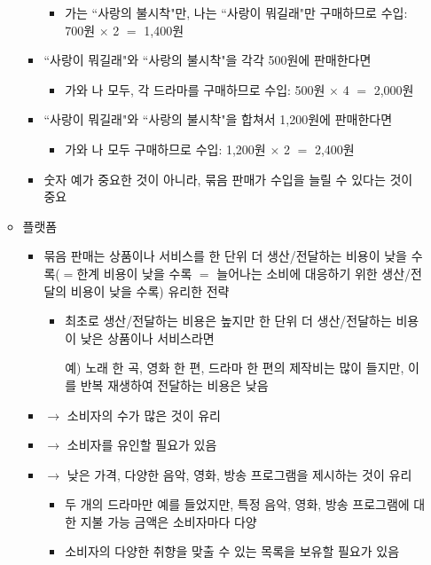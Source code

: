 \begin{itemize}
\begin{itemize}
\begin{itemize}
			\begin{itemize}
			\item 가는 ``사랑의 불시착"만, 나는 ``사랑이 뭐길래"만 구매하므로 수입: 700원 $\times$ 2 $=$ 1,400원
			\end{itemize}
		\item ``사랑이 뭐길래"와 ``사랑의 불시착"을 각각 500원에 판매한다면
			\begin{itemize}
			\item 가와 나 모두, 각 드라마를 구매하므로 수입: 500원 $\times$ 4 $ = $ 2,000원
			\end{itemize}
		\item ``사랑이 뭐길래"와 ``사랑의 불시착"을 합쳐서 1,200원에 판매한다면
			\begin{itemize}
			\item 가와 나 모두 구매하므로 수입: 1,200원 $\times$ 2 $ = $ 2,400원
			\end{itemize}
		\item 숫자 예가 중요한 것이 아니라, 묶음 판매가 수입을 늘릴 수 있다는 것이 중요
		\end{itemize}
	\item 플랫폼
		\begin{itemize}
		\item 묶음 판매는 상품이나 서비스를 한 단위 더 생산/전달하는 비용이 낮을 수록($=$한계 비용이 낮을 수록 $=$ 늘어나는 소비에 대응하기 위한 생산/전달의 비용이 낮을 수록) 유리한 전략
			\begin{itemize}
			\item 최초로 생산/전달하는 비용은 높지만 한 단위 더 생산/전달하는 비용이 낮은 상품이나 서비스라면
			\item[예)] 노래 한 곡, 영화 한 편, 드라마 한 편의 제작비는 많이 들지만, 이를 반복 재생하여 전달하는 비용은 낮음 
			\end{itemize}
		\item $\rightarrow$ 소비자의 수가 많은 것이 유리
		\item $\rightarrow$ 소비자를 유인할 필요가 있음
		\item $\rightarrow$ 낮은 가격, 다양한 음악, 영화, 방송 프로그램을 제시하는 것이 유리
			\begin{itemize}
			\item 두 개의 드라마만 예를 들었지만, 특정 음악, 영화, 방송 프로그램에 대한 지불 가능 금액은 소비자마다 다양
			\item 소비자의 다양한 취향을 맞출 수 있는 목록을 보유할 필요가 있음
			\end{itemize}
		\end{itemize}

\end{itemize}
\end{itemize}
